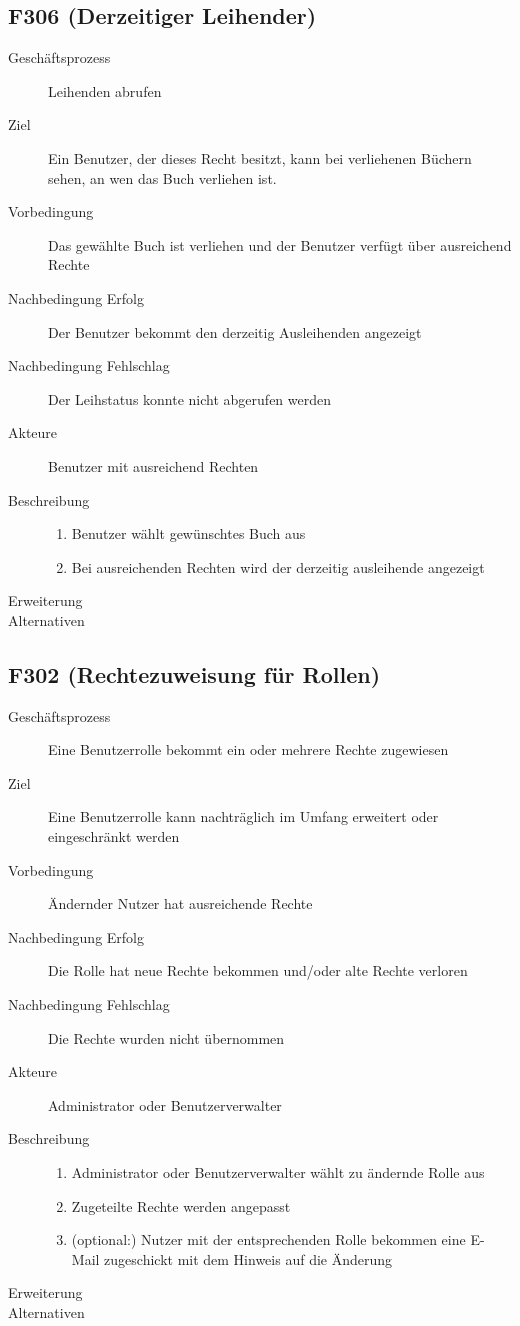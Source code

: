 \subsection{F306 (Derzeitiger Leihender)}    %
\begin{description}
  \item[Geschäftsprozess]Leihenden abrufen
  \item[Ziel]Ein Benutzer, der dieses Recht besitzt, kann bei verliehenen Büchern sehen, an wen das Buch verliehen ist.
  \item[Vorbedingung]Das gewählte Buch ist verliehen und der Benutzer verfügt über ausreichend Rechte
  \item[Nachbedingung Erfolg]Der Benutzer bekommt den derzeitig Ausleihenden angezeigt
  \item[Nachbedingung Fehlschlag]Der Leihstatus konnte nicht abgerufen werden
  \item[Akteure]Benutzer mit ausreichend Rechten
  \item[Beschreibung]\hfill
  \begin{enumerate}
  \item Benutzer wählt gewünschtes Buch aus
  \item Bei ausreichenden Rechten wird der derzeitig ausleihende angezeigt
  \end{enumerate}
  \item[Erweiterung]
  \item[Alternativen]
\end{description}

\subsection{F302 (Rechtezuweisung für Rollen)} 
\begin{description}
  \item[Geschäftsprozess]Eine Benutzerrolle bekommt ein oder mehrere Rechte zugewiesen
  \item[Ziel]Eine Benutzerrolle kann nachträglich im Umfang erweitert oder eingeschränkt werden
  \item[Vorbedingung]Ändernder Nutzer hat ausreichende Rechte
  \item[Nachbedingung Erfolg]Die Rolle hat neue Rechte bekommen und/oder alte Rechte verloren
  \item[Nachbedingung Fehlschlag]Die Rechte wurden nicht übernommen
  \item[Akteure]Administrator oder Benutzerverwalter
  \item[Beschreibung]\hfill
  \begin{enumerate}
  \item Administrator oder Benutzerverwalter wählt zu ändernde Rolle aus
  \item Zugeteilte Rechte werden angepasst
  \item (optional:) Nutzer mit der entsprechenden Rolle bekommen eine E-Mail zugeschickt mit dem Hinweis auf die Änderung
  \end{enumerate}
  \item[Erweiterung]
  \item[Alternativen]
\end{description}

